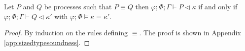 \begin{lemma}\label{lemma:scbg}
Let $P$ and $Q$ be processes such that $P\equiv Q$ then $\varphi;\Phi;\Gamma\vdash P \triangleleft \kappa$ if and only if $\varphi;\Phi;\Gamma\vdash Q \triangleleft \kappa'$ with $\varphi;\Phi\vDash \kappa = \kappa'$.
\begin{proof} By induction on the rules defining $\equiv$. The proof is shown in Appendix \ref{app:sizedtypesoundness}.

\end{proof}
\end{lemma}
